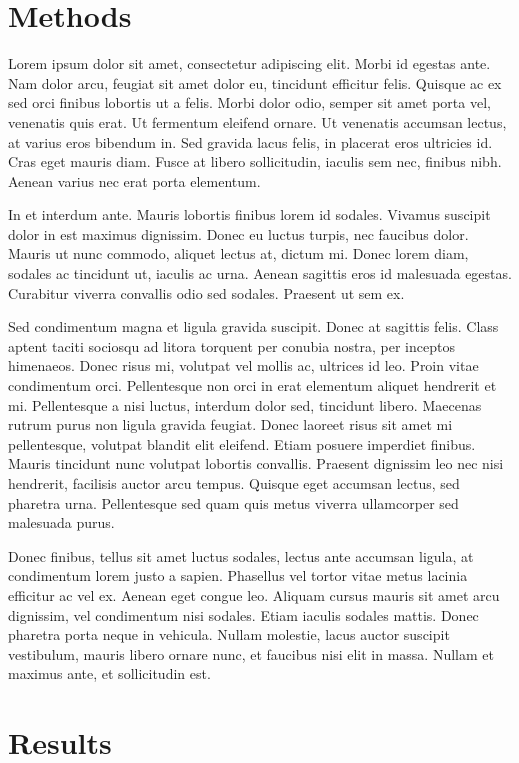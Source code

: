 \documentclass[10pt, onecolumn]{revtex4}    %
\begin{document}
\section{Methods} 

Lorem ipsum dolor sit amet, consectetur adipiscing elit. Morbi id egestas ante. Nam dolor arcu, feugiat sit amet dolor eu, tincidunt efficitur felis. Quisque ac ex sed orci finibus lobortis ut a felis. Morbi dolor odio, semper sit amet porta vel, venenatis quis erat. Ut fermentum eleifend ornare. Ut venenatis accumsan lectus, at varius eros bibendum in. Sed gravida lacus felis, in placerat eros ultricies id. Cras eget mauris diam. Fusce at libero sollicitudin, iaculis sem nec, finibus nibh. Aenean varius nec erat porta elementum.

In et interdum ante. Mauris lobortis finibus lorem id sodales. Vivamus suscipit dolor in est maximus dignissim. Donec eu luctus turpis, nec faucibus dolor. Mauris ut nunc commodo, aliquet lectus at, dictum mi. Donec lorem diam, sodales ac tincidunt ut, iaculis ac urna. Aenean sagittis eros id malesuada egestas. Curabitur viverra convallis odio sed sodales. Praesent ut sem ex.

Sed condimentum magna et ligula gravida suscipit. Donec at sagittis felis. Class aptent taciti sociosqu ad litora torquent per conubia nostra, per inceptos himenaeos. Donec risus mi, volutpat vel mollis ac, ultrices id leo. Proin vitae condimentum orci. Pellentesque non orci in erat elementum aliquet hendrerit et mi. Pellentesque a nisi luctus, interdum dolor sed, tincidunt libero. Maecenas rutrum purus non ligula gravida feugiat. Donec laoreet risus sit amet mi pellentesque, volutpat blandit elit eleifend. Etiam posuere imperdiet finibus. Mauris tincidunt nunc volutpat lobortis convallis. Praesent dignissim leo nec nisi hendrerit, facilisis auctor arcu tempus. Quisque eget accumsan lectus, sed pharetra urna. Pellentesque sed quam quis metus viverra ullamcorper sed malesuada purus.

Donec finibus, tellus sit amet luctus sodales, lectus ante accumsan ligula, at condimentum lorem justo a sapien. Phasellus vel tortor vitae metus lacinia efficitur ac vel ex. Aenean eget congue leo. Aliquam cursus mauris sit amet arcu dignissim, vel condimentum nisi sodales. Etiam iaculis sodales mattis. Donec pharetra porta neque in vehicula. Nullam molestie, lacus auctor suscipit vestibulum, mauris libero ornare nunc, et faucibus nisi elit in massa. Nullam et maximus ante, et sollicitudin est.
 
\section{Results} 
\end{document}
